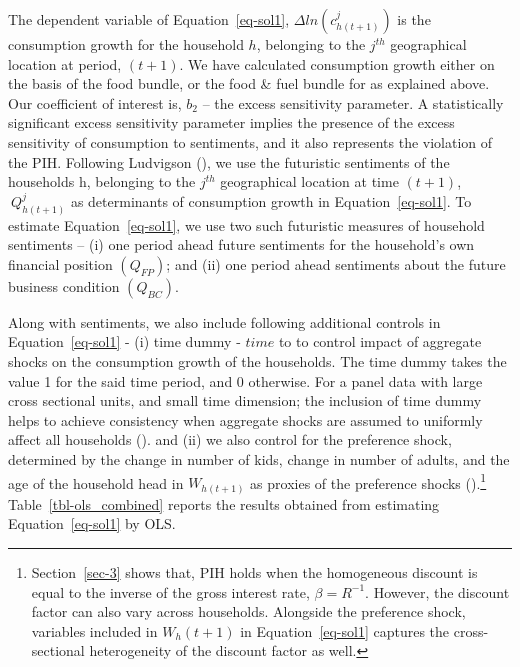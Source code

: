 \documentclass[
  abstract]{scrartcl}
\begin{document}
The dependent variable of Equation~\ref{eq-sol1},
\(\Delta ln\left(c_{h\left(t+1\right)}^j\right)\) is the consumption
growth for the household \(h\), belonging to the \(j^{th}\) geographical
location at period, \((t+1)\). We have calculated consumption growth
either on the basis of the food bundle, or the food \& fuel bundle for
as explained above. Our coefficient of interest is, \(b_2\) -- the
excess sensitivity parameter. A statistically significant excess
sensitivity parameter implies the presence of the excess sensitivity of
consumption to sentiments, and it also represents the violation of the
PIH. Following Ludvigson (), we use
the futuristic sentiments of the households h, belonging to the
\(j^{th}\) geographical location at time \((t+1)\),
\(\ Q_{h\left(t+1\right)}^j\) as determinants of consumption growth in
Equation~\ref{eq-sol1}. To estimate Equation~\ref{eq-sol1}, we use two
such futuristic measures of household sentiments -- (i) one period ahead
future sentiments for the household's own financial position
\(\left(Q_{FP}\right)\); and (ii) one period ahead sentiments about the
future business condition \(\left(Q_{BC}\right)\).

Along with sentiments, we also include following additional controls in
Equation~\ref{eq-sol1} - (i) time dummy - \(time\) to to control impact
of aggregate shocks on the consumption growth of the households. The
time dummy takes the value 1 for the said time period, and 0 otherwise.
For a panel data with large cross sectional units, and small time
dimension; the inclusion of time dummy helps to achieve consistency when
aggregate shocks are assumed to uniformly affect all households
(). and (ii) we
also control for the preference shock, determined by the change in
number of kids, change in number of adults, and the age of the household
head in \(W_{h\left(t+1\right)}\) as proxies of the preference shocks
().\footnote{Section~\ref{sec-3}
  shows that, PIH holds when the homogeneous discount is equal to the
  inverse of the gross interest rate, \(\beta=R^{-1}\). However, the
  discount factor can also vary across households. Alongside the
  preference shock, variables included in \(W_h(t+1)\) in
  Equation~\ref{eq-sol1} captures the cross-sectional heterogeneity of
  the discount factor as well.} Table~\ref{tbl-ols_combined} reports the
results obtained from estimating Equation~\ref{eq-sol1} by OLS.
\end{document}
